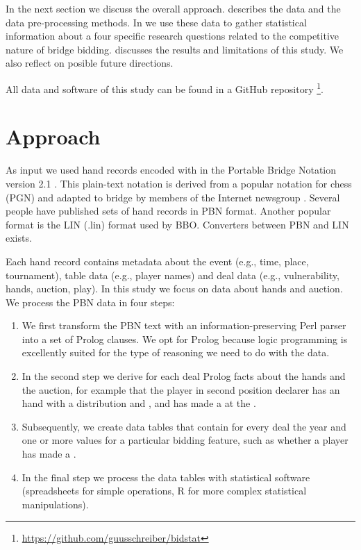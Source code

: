 \documentclass{llncs}
\begin{document}
In the next section we discuss the overall approach. 
describes the data and the data pre-processing methods. 
In  we use these data to gather
statistical information about a four specific research questions
related to the competitive nature of bridge bidding.
 discusses the results and limitations of this
study. We also reflect on posible future directions. 
   
All data and software of this study can be found in a GitHub repository%
\footnote{\url{https://github.com/guusschreiber/bidstat}}.


\section{Approach}
\label{sec:approach}

As input we used hand records encoded with in the Portable Bridge
Notation 
version 2.1 \cite{pbn21}. This plain-text notation is derived from a
popular 
notation for chess (PGN) and adapted to bridge by members of the
Internet newsgroup . Several people have
published sets of hand records in PBN format. Another popular format
is the LIN (.lin) format used by BBO. Converters between PBN and
LIN exists.   

Each hand record contains metadata about the event (e.g., time, place,
tournament), table data (e.g., player names) and deal data (e.g.,
vulnerability, hands, auction, play).  In this study we 
focus on data about hands and auction. We process the PBN data in
four steps:

\begin{enumerate}
\item We first transform the PBN
text with an information-preserving Perl parser into a set of Prolog
clauses. We opt for Prolog because logic programming is
excellently suited for the type of reasoning we need to do with the
data. 
\item In the second step we derive for each deal Prolog facts about
the hands and the auction, for example that the player in second
position declarer has an 
hand with a  distribution and , and has made a
 at the . 
\item Subsequently, we create data tables that contain for every deal
the year and one or more values for a particular bidding
feature, such as whether a player has made a .   
\item In the final step we process the data tables with statistical
software (spreadsheets for simple operations, R for more complex
statistical manipulations). 
\end{enumerate}
\end{document}
